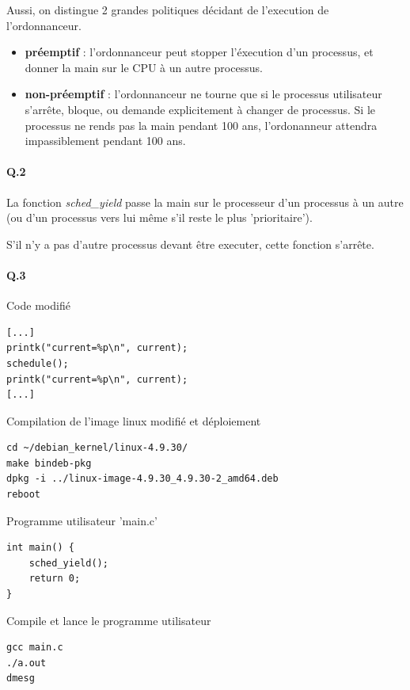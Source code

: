 \documentclass[10pt]{article}
\begin{document}
        
        Aussi, on distingue 2 grandes politiques décidant de l'execution de l'ordonnanceur.
        \begin{itemize}
            \item \textbf{préemptif} : l'ordonnanceur peut stopper l'éxecution d'un processus,
            et donner la main sur le CPU à un autre processus.
            \item \textbf{non-préemptif} : l'ordonnanceur ne tourne que si le processus utilisateur
            s'arrête, bloque, ou demande explicitement à changer de processus.
            Si le processus ne rends pas la main pendant 100 ans, l'ordonanneur attendra impassiblement pendant 100 ans.

        \end{itemize}

        
        \paragraph{Q.2}
        La fonction \textit{sched\_yield} passe la main sur le processeur d'un processus à un autre
        (ou d'un processus vers lui même s'il reste le plus 'prioritaire').
        
        S'il n'y a pas d'autre processus devant être executer, cette fonction s'arrête.
        
        \paragraph{Q.3}
        Code modifié
        \lstset{language=C}
\begin{lstlisting}[frame=single]
[...]
printk("current=%p\n", current);
schedule();
printk("current=%p\n", current);
[...]
\end{lstlisting}

        Compilation de l'image linux modifié et déploiement
\lstset{language=bash}
\begin{lstlisting}[frame=single]
cd ~/debian_kernel/linux-4.9.30/
make bindeb-pkg
dpkg -i ../linux-image-4.9.30_4.9.30-2_amd64.deb
reboot
\end{lstlisting}

Programme utilisateur 'main.c'
\lstset{language=C}
\begin{lstlisting}[frame=single]
int main() {
    sched_yield();
    return 0;
}
\end{lstlisting}

Compile et lance le programme utilisateur
\begin{lstlisting}[frame=single]
gcc main.c
./a.out
dmesg
\end{lstlisting}
\end{document}
